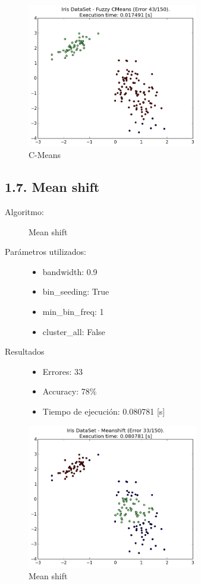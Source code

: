 \documentclass{article}
\begin{document}
\begin{figure}[H]
  \centering
  \includegraphics[width=0.666\textwidth]{img/FuzzyCMeans.png}
  \caption{C-Means}
\end{figure}

\newpage




\subsection*{1.7. \; Mean shift}

\begin{description}
  \item[Algoritmo:] Mean shift
  \item[Parámetros utilizados:] \hfill
    \begin{itemize}
      \item bandwidth: 0.9
      \item bin\_seeding: True
      \item min\_bin\_freq: 1
      \item cluster\_all: False
    \end{itemize}
  \item[Resultados]\hfill
    \begin{itemize}
      \item Errores: 33
      \item Accuracy:  78\%
      \item Tiempo de ejecución: 0.080781 [s]
    \end{itemize}
\end{description}

\begin{figure}[H]
  \centering
  \includegraphics[width=0.666\textwidth]{img/Meanshift.png}
  \caption{Mean shift}
\end{figure}
\end{document}
